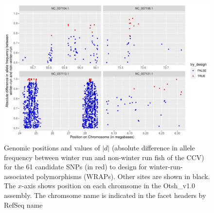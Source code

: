 \begin{figure}
\includegraphics[width=\textwidth]{images/wrap-candi.pdf}
\caption[
	61 candidates for primer design for winter-run-associated polymorphisms
]{
	\footnotesize Genomic positions and values of $|d|$ (absolute difference in
	allele frequency between winter run and non-winter run fish of the CCV)
	for the 61 candidate SNPs (in red) to design for winter-run-associated polymorphisms
	(WRAPs).  Other sites are shown in black.  The $x$-axis shows position on
	each chromsome in the Otsh\_v1.0 assembly.  The chromsome name is indicated in the facet headers by
	RefSeq name
}
\label{fig:wrap-candi}
\end{figure}

